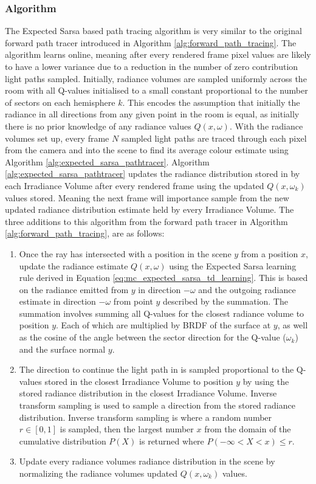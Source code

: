 \documentclass[../dissertation.tex]{subfiles}
\begin{document}
\subsubsection{Algorithm}
The Expected Sarsa based path tracing algorithm is very similar to the original forward path tracer introduced in Algorithm \ref{alg:forward_path_tracing}. The algorithm learns online, meaning after every rendered frame pixel values are likely to have a lower variance due to a reduction in the number of zero contribution light paths sampled. Initially, radiance volumes are sampled uniformly across the room with all Q-values initialised to a small constant proportional to the number of sectors on each hemisphere $k$. This encodes the assumption that initially the radiance in all directions from any given point in the room is equal, as initially there is no prior knowledge of any radiance values $Q(x, \omega)$. With the radiance volumes set up, every frame $N$ sampled light paths are traced through each pixel from the camera and into the scene to find its average colour estimate using Algorithm \ref{alg:expected_sarsa_pathtracer}. Algorithm \ref{alg:expected_sarsa_pathtracer} updates the radiance distribution stored in by each Irradiance Volume after every rendered frame using the updated $Q(x, \omega_k)$ values stored. Meaning the next frame will importance sample from the new updated radiance distribution estimate held by every Irradiance Volume. The three additions to this algorithm from the forward path tracer in Algorithm \ref{alg:forward_path_tracing}, are as follows:

\begin{enumerate}
\item Once the ray has intersected with a position in the scene $y$ from a position $x$, update the radiance estimate $Q(x, \omega)$ using the Expected Sarsa learning rule derived in Equation \ref{eq:mc_expected_sarsa_td_learning}. This is based on the radiance emitted from $y$ in direction $-\omega$ and the outgoing radiance estimate in direction $-\omega$ from point $y$ described by the summation. The summation involves summing all Q-values for the closest radiance volume to position $y$. Each of which are multiplied by BRDF of the surface at $y$, as well as the cosine of the angle between the sector direction for the Q-value ($\omega_k$) and the surface normal $y$.

\item The direction to continue the light path in is sampled proportional to the Q-values stored in the closest Irradiance Volume to position $y$ by using the stored radiance distribution in the closest Irradiance Volume.  Inverse transform sampling \cite{devroye2006nonuniform} is used to sample a direction from the stored radiance distribution. Inverse transform sampling is where a random number $r \in [0,1]$ is sampled, then the largest number $x$ from the domain of the cumulative distribution $P(X)$ is returned where $ P(-\infty < X < x) \leq r$. 

\item Update every radiance volumes radiance distribution in the scene by normalizing the radiance volumes updated $Q(x, \omega_k)$ values. 
\end{enumerate}
\end{document}
